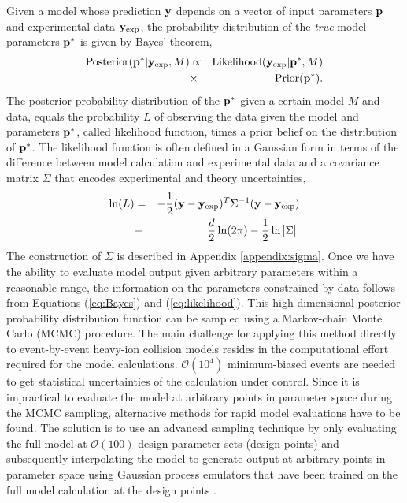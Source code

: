 \documentclass[aps, prc, reprint, amsmath, groupedaddress, nofootinbib]{revtex4-1}
\begin{document}
Given a model whose prediction ${\bf y}$ depends on a vector of input parameters ${\bf p}$ and  experimental data ${\bf y}_\textrm{exp}$, 
the probability distribution of the {\it true} model parameters ${\bf p^*}$ is given by Bayes' theorem, 
\begin{eqnarray}\label{eq:Bayes}
\textrm{Posterior}({\bf p^*}|{\bf y}_\textrm{exp}, M) &\propto& \textrm{Likelihood}({\bf y}_\textrm{exp}|{\bf p^*}, M) \nonumber \\ &\times& \textrm{Prior}({\bf p^*}).
\end{eqnarray}
The posterior probability distribution of the ${\bf p^*}$ given a certain model $M$ and data, equals the probability $L$ of observing the data given the model and parameters ${\bf p^*}$, called likelihood function, times a prior belief on the distribution of ${\bf p^*}$.
The likelihood function is often defined in a Gaussian form in terms of the difference between model calculation and experimental data and a covariance matrix $\Sigma$ that encodes experimental and theory uncertainties,
\begin{eqnarray}\label{eq:likelihood}
\ln(L) &=& -\frac{1}{2}({\bf y}-{\bf y}_{\textrm{exp}})^T\Sigma^{-1} ({\bf y}-{\bf y}_{\textrm{exp}})\nonumber\\ 
		&-&\frac{d}{2}\ln(2\pi)-\frac{1}{2}\ln|\Sigma|.
\end{eqnarray}
The construction of $\Sigma$ is described in Appendix \ref{appendix:sigma}.
Once we have the ability to evaluate model output given arbitrary parameters within a reasonable range, the information on the parameters constrained by data follows from Equations (\ref{eq:Bayes}) and (\ref{eq:likelihood}).
This high-dimensional posterior probability distribution function can be sampled using a Markov-chain Monte Carlo (MCMC) procedure.
The main challenge for applying this method directly to event-by-event heavy-ion collision models resides in the computational effort required for the model calculations.  $\mathcal{O}(10^4)$ minimum-biased events are needed to get statistical uncertainties of the calculation under control.
Since it is impractical to evaluate the model  at arbitrary points in parameter space during the MCMC sampling, alternative methods for rapid model evaluations have to be found.
The solution is to use an advanced sampling technique by only evaluating the full model at $\mathcal{O}(100)$ design parameter sets (design points) and subsequently interpolating the model to generate output at arbitrary points in parameter space using  Gaussian process emulators that have been trained on the full model calculation at the design points \cite{Rasmussen:2006gp}.
\end{document}
